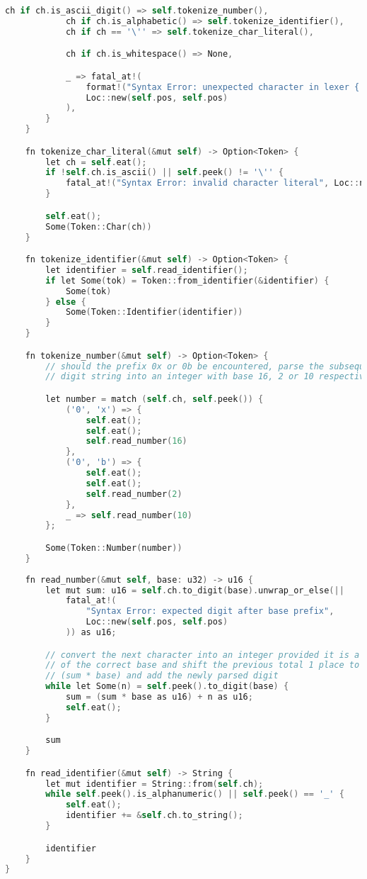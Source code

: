\begin{lstlisting}[language=C]
            ch if ch.is_ascii_digit() => self.tokenize_number(),
            ch if ch.is_alphabetic() => self.tokenize_identifier(),
            ch if ch == '\'' => self.tokenize_char_literal(),

            ch if ch.is_whitespace() => None,

            _ => fatal_at!(
                format!("Syntax Error: unexpected character in lexer {:?}", self.ch),
                Loc::new(self.pos, self.pos)
            ),
        }
    }

    fn tokenize_char_literal(&mut self) -> Option<Token> {
        let ch = self.eat();
        if !self.ch.is_ascii() || self.peek() != '\'' {
            fatal_at!("Syntax Error: invalid character literal", Loc::new(self.pos - 1, self.pos - 1))
        }

        self.eat();
        Some(Token::Char(ch))
    }

    fn tokenize_identifier(&mut self) -> Option<Token> {
        let identifier = self.read_identifier();
        if let Some(tok) = Token::from_identifier(&identifier) {
            Some(tok)
        } else {
            Some(Token::Identifier(identifier))
        }
    }

    fn tokenize_number(&mut self) -> Option<Token> {
        // should the prefix 0x or 0b be encountered, parse the subsequent 
        // digit string into an integer with base 16, 2 or 10 respectively

        let number = match (self.ch, self.peek()) {
            ('0', 'x') => {
                self.eat();
                self.eat();
                self.read_number(16)
            },
            ('0', 'b') => {
                self.eat();
                self.eat();
                self.read_number(2)
            },
            _ => self.read_number(10)
        };

        Some(Token::Number(number))
    }
    
    fn read_number(&mut self, base: u32) -> u16 {
        let mut sum: u16 = self.ch.to_digit(base).unwrap_or_else(|| 
            fatal_at!(
                "Syntax Error: expected digit after base prefix", 
                Loc::new(self.pos, self.pos)
            )) as u16;

        // convert the next character into an integer provided it is a digit 
        // of the correct base and shift the previous total 1 place to the left 
        // (sum * base) and add the newly parsed digit 
        while let Some(n) = self.peek().to_digit(base) {
            sum = (sum * base as u16) + n as u16;
            self.eat();
        }

        sum
    }

    fn read_identifier(&mut self) -> String {
        let mut identifier = String::from(self.ch);
        while self.peek().is_alphanumeric() || self.peek() == '_' {
            self.eat();
            identifier += &self.ch.to_string(); 
        }

        identifier
    }
}
\end{lstlisting}

